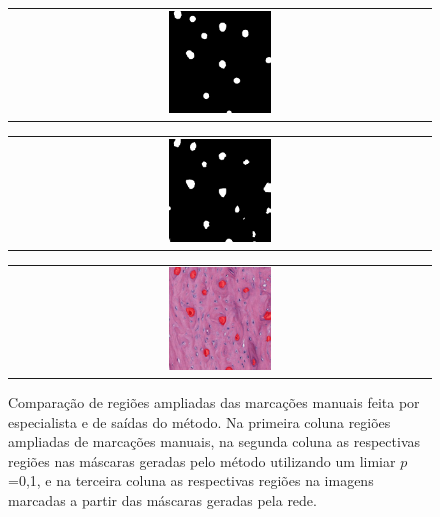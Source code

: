 \begin{figure}[H]
    \begin{tabular}{@{}c@{}}
        \includegraphics[width=0.25\textwidth]{figures/4_results/204_r4c2_mask_manual_10.png}
        \\[\abovecaptionskip]
    \end{tabular}
    \begin{tabular}{@{}c@{}}
        \includegraphics[width=0.25\textwidth]{figures/4_results/204_r4c2_mask_net_10.png}
        \\[\abovecaptionskip]
    \end{tabular}
    \begin{tabular}{@{}c@{}}
        \includegraphics[width=0.25\textwidth]{figures/4_results/204_r4c2_net_out_10.png}
        \\[\abovecaptionskip]
    \end{tabular}
  
    \caption[Comparação de regiões ampliadas das marcações manuais feita por especialista e de saídas do método]{Comparação de regiões ampliadas das marcações manuais feita por especialista e de saídas do método. Na primeira coluna regiões ampliadas de marcações manuais, na segunda coluna as respectivas regiões nas máscaras geradas pelo método utilizando um limiar $p$=0,1, e na terceira coluna as respectivas regiões na imagens marcadas a partir das máscaras geradas pela rede.}
    \label{fig:marcacoes-final-canal-regioes}
\end{figure}

